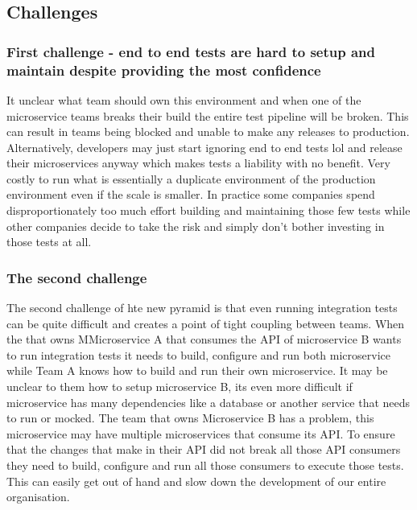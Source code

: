\documentclass[a4paper, 11pt]{book}
\begin{document}
    \subsection{Challenges}

    \subsubsection{First challenge - end to end tests are hard to setup and maintain despite providing the most confidence}
    It unclear what team should own this environment and when one of the microservice teams breaks their build the entire test pipeline will be broken.
    This can result in teams being blocked and unable to make any releases to production.
    Alternatively, developers may just start ignoring end to end tests lol and release their microservices anyway which makes tests a liability with no benefit.
    Very costly to run what is essentially a duplicate environment of the production environment even if the scale is smaller.
    In practice some companies spend disproportionately too much effort building and maintaining those few tests while other companies decide to take the risk and simply don't bother investing in those tests at all.

    \subsubsection{The second challenge}
    The second challenge of hte new pyramid is that even running integration tests can be quite difficult and creates a point of tight coupling between teams.
    When the that owns MMicroservice A that consumes the API of microservice B wants to run integration tests it needs to build, configure and run both microservice while Team A knows how to build and run their own microservice.
    It may be unclear to them how to setup microservice B, its even more difficult if microservice has many dependencies like a database or another service that needs to run or mocked.
    The team that owns Microservice B has a problem, this microservice may have multiple microservices that consume its API.
    To ensure that the changes that make in their API did not break all those API consumers they need to build, configure and run all those consumers to execute those tests.
    This can easily get out of hand and slow down the development of our entire organisation.
\end{document}
